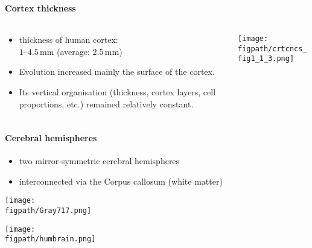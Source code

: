 \documentclass[8pt,t,usepdftitle=false]{beamer}
\def\figpath{\src/figures}
\begin{document}
\begin{frame}[plain]
  \frametitle{\ttl}
  \framesubtitle{Cortex thickness}
  \begin{columns}
    \begin{column}{0.45\linewidth}
      \begin{itemize}\itemsep1ex
      \item<1-> thickness of human cortex:\\
        $1$--$4.5\,\text{mm}$ (average: $2.5\,\text{mm}$)
      \item<2-> Evolution increased mainly the surface of the cortex.
      \item<2-> Its vertical organisation
      (thickness, cortex layers, cell proportions, etc.) remained relatively constant.
      \end{itemize}
    \end{column}
    \begin{column}{0.55\linewidth}
      \begin{center}
        \vspace*{-0.5cm}
        \parbox{\linewidth}{
          \texttt{[image: \\figpath/crtcncs\_fig1\_1\_3.png]}
          \hspace*{\fill}\tiny{}
        }
        \end{center}
    \end{column}
  \end{columns}
\end{frame}
\begin{frame}[plain]
  \frametitle{\ttl}
  \framesubtitle{Cerebral hemispheres}
  \begin{itemize}\itemsep1ex
  \item two mirror-symmetric cerebral hemispheres
  \item interconnected via the Corpus callosum (white matter)
  \end{itemize}
  \begin{center}
    \parbox{\linewidth}{
      \parbox[b]{0.45\linewidth}{
        \texttt{[image: \\figpath/Gray717.png]}
        \hspace*{\fill}\tiny\color{gray}{(Gray, 1918)}
      }%
      \hfill%
      \parbox[b]{0.5\linewidth}{
        \texttt{[image: \\figpath/humbrain.png]}
        \hspace*{\fill}\tiny{}
      }      
    }
  \end{center}
\end{frame}
\end{document}
